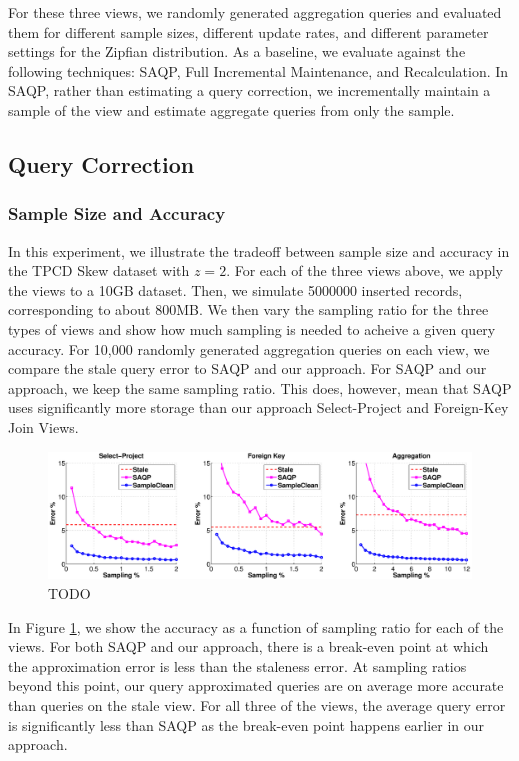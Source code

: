 \vspace{1em}

For these three views, we randomly generated aggregation queries and evaluated them for different sample sizes, different update rates, and different parameter settings for the Zipfian distribution.
As a baseline, we evaluate against the following techniques: SAQP, Full Incremental Maintenance, and Recalculation.
In SAQP, rather than estimating a query correction, we incrementally maintain a sample of the view and estimate aggregate queries from only the sample.

\subsection{Query Correction}

\subsubsection{Sample Size and Accuracy}
In this experiment, we illustrate the tradeoff between sample size and accuracy in the TPCD Skew dataset with $z = 2$.
For each of the three views above, we apply the views to a 10GB dataset.
Then, we simulate 5000000 inserted records, corresponding to about 800MB.
We then vary the sampling ratio for the three types of views and show how much sampling is needed to acheive a given query accuracy.
For 10,000 randomly generated aggregation queries on each view, we compare the stale query error to SAQP and our approach.
For SAQP and our approach, we keep the same sampling ratio.
This does, however, mean that SAQP uses significantly more storage than our approach Select-Project and Foreign-Key Join Views.

\begin{figure}[h]
\label{exp1sample}
\centering
 \includegraphics[width=\textwidth]{exp/exp1-samplesize-accuracy.eps}
 \caption{TODO}
\end{figure}

In Figure \ref{exp1sample}, we show the accuracy as a function of sampling ratio for each of the views.
For both SAQP and our approach, there is a break-even point at which the approximation error is less than the staleness error.
At sampling ratios beyond this point, our query approximated queries are on average more accurate than queries on the stale view.
For all three of the views, the average query error is significantly less than SAQP as the break-even point happens earlier in our approach.

